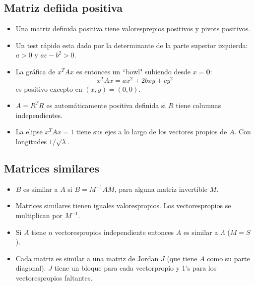 \documentclass[]{article}
\begin{document}
\subsection{Matriz defiida positiva}

\begin{itemize}
	
	\item Una matriz definida positiva tiene valoresprepios positivos y pivots positivos.
	
	\item Un test r\'apido esta dado por la determinante de la parte superior izquierda: $ a > 0 $ y  $ ac-b^{2} > 0 $. 
	
	\item La gr\'afica de $ x^{T}Ax $ es entonces un ``bowl" subiendo desde $ x=\textbf{0} $: 
	\[
	x^{T}Ax=ax^{2}+2bxy+cy^{2}
	\]
	es positivo excepto en $ (x,y)=(0,0) $.
	
	\item $ A=R^{T}R $ es autom\'aticamente positiva definida si $ R $ tiene columnas independientes. 
	
	\item La elipse $ x^{T}Ax=1 $ tiene sus ejes a lo largo de los vectores propios de $ A $. Con longitudes $ 1/\sqrt{\lambda} $.
	
\end{itemize}

\subsection{Matrices similares}

\begin{itemize}
	
	\item $ B $ es similar a $ A $ si $ B=M^{-1}AM $, para alguna matriz invertible $ M $. 
	
	\item Matrices similares tienen iguales valorespropios. Los vectorespropios se multiplican por $ M^{-1} $.
	
	\item Si $ A $ tiene $ n $ vectorespropios independiente entonces $ A $ es similar a $ \Lambda $ ($ M=S $). 
	
	\item Cada matriz es similar a una matriz de Jordan $ J $ (que tiene $ A $ como su parte diagonal). $ J $ tiene un bloque para cada vectorpropio y 1's para los vectorespropios faltantes. 
	
\end{itemize}
\end{document}
